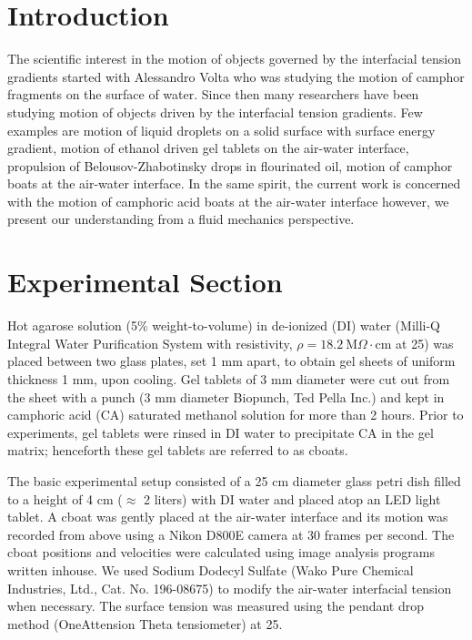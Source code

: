 \documentclass[journal=langd5, manuscript=article, layout=twocolumn]{achemso}
\begin{document}

\section{Introduction}
The scientific interest in the motion of objects governed by the interfacial tension gradients started with Alessandro Volta who was studying the motion of camphor fragments on the surface of water. Since then many researchers have been studying motion of objects driven by the interfacial tension gradients. Few examples are motion of liquid droplets on a solid surface with surface energy gradient\cite{whitesides1992}, motion of ethanol driven gel tablets on the air-water interface\cite{velev2012}, propulsion of Belousov-Zhabotinsky drops in flourinated oil\cite{herminghaus2011}, motion of camphor boats at the air-water interface\cite{nakata2001}. In the same spirit, the current work is concerned with the motion of camphoric acid boats at the air-water interface however, we present our understanding from a fluid mechanics perspective.

\section{Experimental Section}
Hot agarose solution (5\% weight-to-volume) in de-ionized (DI) water (Milli-Q Integral Water Purification System with resistivity, $\rho=18.2\ \mathrm{M}\Omega\cdot\mathrm{cm}$ at 25\celsius) was placed between two glass plates, set 1 mm apart, to obtain gel sheets of uniform thickness 1 mm, upon cooling. Gel tablets of 3 mm diameter were cut out from the sheet with a punch (3 mm diameter Biopunch, Ted Pella Inc.) and kept in camphoric acid (CA) saturated methanol solution for more than 2 hours. Prior to experiments, gel tablets were rinsed in DI water to precipitate CA in the gel matrix; henceforth these gel tablets are referred to as cboats.

The basic experimental setup consisted of a 25 $\mathrm{cm}$ diameter glass petri dish filled to a height of 4 cm ($\approx$ 2 liters) with DI water and placed atop an LED light tablet. A cboat was gently placed at the air-water interface and its motion was recorded from above using a Nikon D800E camera at 30 frames per second. The cboat positions and velocities were calculated using image analysis programs written inhouse. We used Sodium Dodecyl Sulfate (Wako Pure Chemical Industries, Ltd., Cat. No. 196-08675) to modify the air-water interfacial tension when necessary. The surface tension was measured using the pendant drop method (OneAttension Theta tensiometer) at 25\celsius. 
\end{document}
